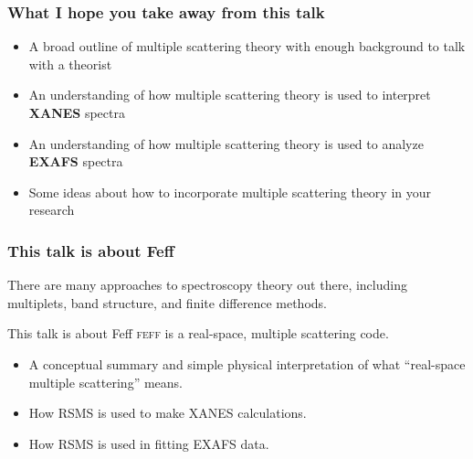 

\begin{frame}
  \frametitle{What I hope you take away from this talk}
  \begin{itemize}
  \item A broad outline of multiple scattering theory with enough
    background to talk with a theorist
  \item An understanding of how multiple scattering theory is used to
    interpret \textbf{XANES} spectra
  \item An understanding of how multiple scattering theory is used to
    analyze \textbf{EXAFS} spectra
  \item Some ideas about how to incorporate multiple scattering theory
    in your research
  \end{itemize}
\end{frame}

\begin{frame}
  \frametitle{This talk is about Feff}

  There are many approaches to spectroscopy theory out there,
  including multiplets, band structure, and finite difference methods.

  \bigskip

  \begin{exampleblock}{This talk is about Feff}
    \centering\textsc{feff} is a real-space, multiple scattering code.
  \end{exampleblock}
  
  \bigskip

  \begin{itemize}
  \item A conceptual summary and simple physical interpretation of
    what ``real-space multiple scattering'' means.
  \item How RSMS is used to make XANES calculations.
  \item How RSMS is used in fitting EXAFS data.
  \end{itemize}

\end{frame}


